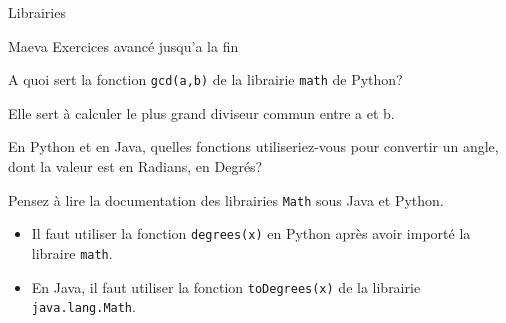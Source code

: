 \begin{section}{Librairies}
\begin{conseil}
\begin{note}{Maeva}
    Exercices avancé jusqu'a la fin
\end{note}
\end{conseil} 
\begin{Exercice}[5 minutes]
	A quoi sert la fonction \lstinline{gcd(a,b)} de la librairie \lstinline{math} de Python? 
\end{Exercice} 
\begin{solution}
	Elle sert à calculer le plus grand diviseur commun entre a et b.
\end{solution} 
\begin{Exercice}[5 minutes]
    En Python et en Java, quelles fonctions utiliseriez-vous pour convertir un angle, dont la valeur est en Radians, en Degrés? 
\end{Exercice}
\begin{conseil}
    Pensez à lire la documentation des librairies \lstinline{Math} sous Java et Python.
\end{conseil}
\begin{solution}
    \begin{itemize}
        \item Il faut utiliser la fonction \lstinline{degrees(x)} en Python après avoir importé la libraire \lstinline{math}.
        \item En Java, il faut utiliser la fonction \lstinline{toDegrees(x)} de la librairie \lstinline{java.lang.Math}.
    \end{itemize}


\end{solution}
\end{section}
